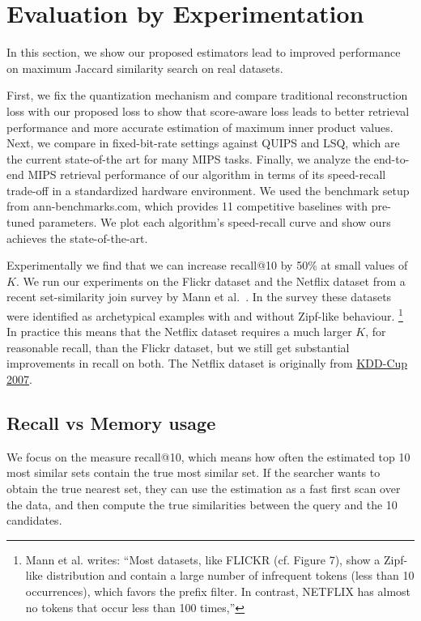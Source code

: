 
\section{Evaluation by Experimentation}\label{sec:evaluation}

In this section, we show our proposed estimators lead to improved performance on maximum
Jaccard similarity search on real datasets.

First, we fix the quantization
mechanism and compare traditional reconstruction
loss with our proposed loss to show that score-aware
loss leads to better retrieval performance and more accurate estimation of maximum inner product values.
Next, we compare in fixed-bit-rate settings against
QUIPS and LSQ, which are the current state-of-the art for many MIPS tasks. Finally, we analyze the
end-to-end MIPS retrieval performance of our algorithm in terms of its speed-recall trade-off in a
standardized hardware environment. We used the
benchmark setup from ann-benchmarks.com, which
provides 11 competitive baselines with pre-tuned parameters. We plot each algorithm’s speed-recall curve
and show ours achieves the state-of-the-art.


Experimentally we find that we can increase recall@10 by 50\% at small values of $K$.
We run our experiments on the Flickr dataset and the Netflix dataset from a recent set-similarity join survey by Mann et al.~\cite{mann2016empirical}.
In the survey these datasets were identified as archetypical examples with and without Zipf-like behaviour.
\footnote{Mann et al. writes:
 ``Most datasets, like FLICKR (cf. Figure 7), show a Zipf-like
 distribution and contain a large number of infrequent tokens (less
 than 10 occurrences), which favors the prefix filter. In contrast,
 NETFLIX has almost no tokens that occur less than 100 times,''
 }
In practice this means that the Netflix dataset requires a much larger $K$, for reasonable recall, than the Flickr dataset, but we still get substantial improvements in recall on both.
The Netflix dataset is originally from \href{https://www.cs.uic.edu/~liub/Netflix-KDD-Cup-2007.html}{KDD-Cup 2007}.

\subsection{Recall vs Memory usage}

We focus on the measure recall@10, which means how often the estimated top 10 most similar sets contain the true most similar set.
If the searcher wants to obtain the true nearest set, they can use the estimation as a fast first scan over the data, and then compute the true similarities between the query and the 10 candidates.

